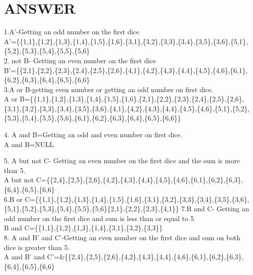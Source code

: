 \documentclass{beamer}
\begin{document}
\section{ANSWER}
\begin{frame}{}

1.A'-Getting an odd number on the first dice\\
A'=\{\{1,1\},\{1,2\},\{1,3\},\{1,4\},\{1,5\},\{1,6\},\{3,1\},\{3,2\},\{3,3\},\{3,4\},\{3,5\},\{3,6\},\{5,1\},\{5,2\},\{5,3\},\{5,4\},\{5,5\},\{5,6\}\\
2. not B- Getting an even number on the first dice\\

B'=\{\{2,1\},\{2,2\},\{2,3\},\{2,4\},\{2,5\},\{2,6\},\{4,1\},\{4,2\},\{4,3\},\{4,4\},\{4,5\},\{4,6\},\{6,1\},\{6,2\},\{6,3\},\{6,4\},\{6,5\},\{6,6\}\\
3.A or B-getting even number or getting an odd number on first dice.\\

A or B=\{\{1,1\},\{1,2\},\{1,3\},\{1,4\},\{1,5\},\{1,6\},\{2,1\},\{2,2\},\{2,3\},\{2,4\},\{2,5\},\{2,6\},\{3,1\},\{3,2\},\{3,3\},\{3,4\},\{3,5\},\{3,6\},\{4,1\},\{4,2\},\{4,3\},\{4,4\},\{4,5\},\{4,6\},\{5,1\},\{5,2\},\{5,3\},\{5,4\},\{5,5\},\{5,6\},\{6,1\},\{6,2\},\{6,3\},\{6,4\},\{6,5\},\{6,6\}\}

4. A and B=Getting an odd and even number on first dice.\\
A and B=NULL\\
\end{frame}
\begin{frame}
5. A but not C- Getting an even number on the first dice and the sum is more than 5.\\
A but not C=\{\{2,4\},\{2,5\},\{2,6\},\{4,2\},\{4,3\},\{4,4\},\{4,5\},\{4,6\},\{6,1\},\{6,2\},\{6,3\},\{6,4\},\{6,5\},\{6,6\}\\
6.B or C=\{\{1,1\},\{1,2\},\{1,3\},\{1,4\},\{1,5\},\{1,6\},\{3,1\},\{3,2\},\{3,3\},\{3,4\},\{3,5\},\{3,6\},\{5,1\},\{5,2\},\{5,3\},\{5,4\},\{5,5\},\{5,6\}\{2,1\},\{2,2\},\{2,3\},\{4,1\}\}
7.B and C- Getting an odd number on the first dice and sum is less than or equal to 5\\
B and C=\{\{1,1\},\{1,2\},\{1,3\},\{1,4\},\{3,1\},\{3,2\},\{3,3\}\}\\
8. A and B' and C'-Getting an even number on the first dice and sum on both dice is greater than 5.\\
A and B' and C'=&\{\{2,4\},\{2,5\},\{2,6\},\{4,2\},\{4,3\},\{4,4\},\{4,6\},\{6,1\},\{6,2\},\{6,3\},\{6,4\},\{6,5\},\{6,6\}\\
\end{frame}
\end{document}
